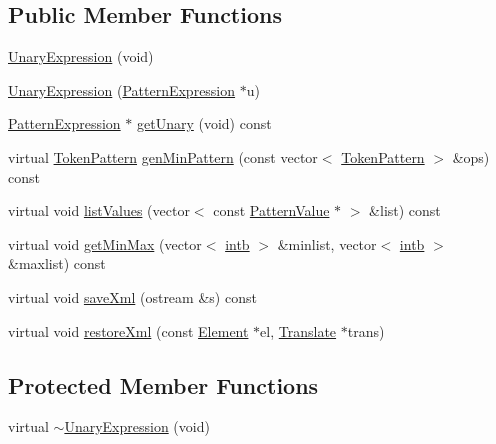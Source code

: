 \subsection*{Public Member Functions}
\begin{DoxyCompactItemize}
\item 
\mbox{\hyperlink{class_unary_expression_a911e7706dd555341854d13556f9141be}{Unary\+Expression}} (void)
\item 
\mbox{\hyperlink{class_unary_expression_a6201bd3ca875240983a127e44651bb0a}{Unary\+Expression}} (\mbox{\hyperlink{class_pattern_expression}{Pattern\+Expression}} $\ast$u)
\item 
\mbox{\hyperlink{class_pattern_expression}{Pattern\+Expression}} $\ast$ \mbox{\hyperlink{class_unary_expression_aa24bf2ae1eb73a512af77b740d00ab75}{get\+Unary}} (void) const
\item 
virtual \mbox{\hyperlink{class_token_pattern}{Token\+Pattern}} \mbox{\hyperlink{class_unary_expression_a007556c4977ab285520e4555a71ea8de}{gen\+Min\+Pattern}} (const vector$<$ \mbox{\hyperlink{class_token_pattern}{Token\+Pattern}} $>$ \&ops) const
\item 
virtual void \mbox{\hyperlink{class_unary_expression_aaa8a88353176bec87fb6afd24bdd80c2}{list\+Values}} (vector$<$ const \mbox{\hyperlink{class_pattern_value}{Pattern\+Value}} $\ast$ $>$ \&list) const
\item 
virtual void \mbox{\hyperlink{class_unary_expression_a1fec3bdcd57cc6bca29f8a00f0e7c406}{get\+Min\+Max}} (vector$<$ \mbox{\hyperlink{types_8h_aa925ba3e627c2df89d5b1cfe84fb8572}{intb}} $>$ \&minlist, vector$<$ \mbox{\hyperlink{types_8h_aa925ba3e627c2df89d5b1cfe84fb8572}{intb}} $>$ \&maxlist) const
\item 
virtual void \mbox{\hyperlink{class_unary_expression_a8b6b833f511d84b606baf8233d271255}{save\+Xml}} (ostream \&s) const
\item 
virtual void \mbox{\hyperlink{class_unary_expression_ab9b25fcf136b758b13a4cbdcc401db69}{restore\+Xml}} (const \mbox{\hyperlink{class_element}{Element}} $\ast$el, \mbox{\hyperlink{class_translate}{Translate}} $\ast$trans)
\end{DoxyCompactItemize}
\subsection*{Protected Member Functions}
\begin{DoxyCompactItemize}
\item 
virtual \mbox{\hyperlink{class_unary_expression_aadd788882f5f7d4208e9b8db8e571d57}{$\sim$\+Unary\+Expression}} (void)
\end{DoxyCompactItemize}
